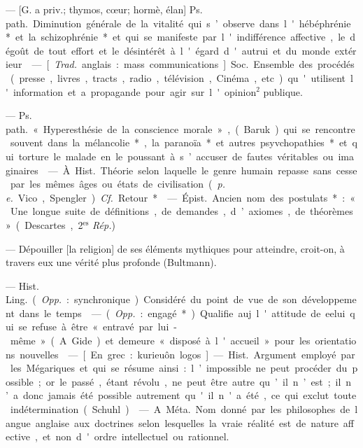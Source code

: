 
	\begin{itemize}[leftmargin=1cm, label=, itemsep=1pt]

 — [G. a priv.; thymos,
cœur; hormè, élan] \si{Ps. path.}
Diminution générale de la vitalité
qui s’observe dans l'hébéphrénie*
et la schizophrénie* et qui se manifeste par l'indifférence affective,
le dégoût de tout effort et le désintérêt à l'égard d'autrui et du
monde extérieur.

 — [{\it Trad.}
anglais : mass communications]
\si{Soc.} Ensemble des procédés
(presse, livres, tracts, radio, télévision, Cinéma, etc.) qu'utilisent
l'information et a propagande
pour agir sur l'opinion$^2$ publique.

 — \si{Ps. path.} « Hyperesthésie de la conscience
morale », (Baruk) qui se rencontre
souvent dans la mélancolie*, la
paranoïa* et autres psyvchopathies*
et qui torture le malade en le poussant à s’accuser de fautes véritables
ou imaginaires.

 — À. \si{Hist.}
Théorie selon laquelle le genre
humain repasse sans cesse par les
mêmes âges ou états de civilisation
({\it p. e.} Vico, Spengler). {\it Cf.} Retour*.

 — \si{Épist.} Ancien nom des
postulats* : « Une longue suite de
définitions, de demandes, d’axiomes, de théorèmes... » (Descartes,
2$^\text{es}$ {\it Rép.})

 — Dépouiller [la
religion] de ses éléments mythiques
pour atteindre, croit-on, à travers
eux une vérité plus profonde (Bultmann).

 — \si{Hist. Ling.} ({\it Opp.} :
synchronique). Considéré du point
de vue de son développement
dans le temps.

 — ({\it Opp.} : engagé*).
Qualifie auj. l'attitude de eelui
qui se refuse à être « entravé par
lui-même » (A. Gide) et demeure
« disposé à l'accueil » pour les
orientations nouvelles.

 — [En grec :
kurieuôn logos] — \si{Hist.} Argument
employé par les Mégariques et qui
se résume ainsi : l’impossible ne
peut procéder du possible ; or le
passé, étant révolu, ne peut être
autre qu’il n’est ; il n’a donc jamais
été possible autrement qu'il n'a
été, ce qui exclut toute indétermination (Schuhl).

 — A. \si{Méta.} Nom donné
par les philosophes de langue anglaise aux doctrines selon lesquelles la vraie réalité est de
nature affective, et non d'ordre
intellectuel ou rationnel.


\end{itemize}
